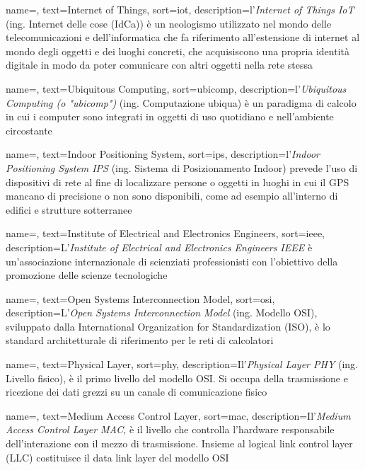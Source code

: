  {
    name=,
    text=Internet of Things,
    sort=iot,
    description={l'\emph{Internet of Things IoT} (ing. Internet delle cose (IdCa)) è un neologismo utilizzato nel mondo delle telecomunicazioni e dell'informatica che fa riferimento all'estensione di internet al mondo degli oggetti e dei luoghi concreti, che acquisiscono una propria identità digitale in modo da poter comunicare con altri oggetti nella rete stessa}
}

 {
    name=,
    text=Ubiquitous Computing,
    sort=ubicomp,
    description={l'\emph{Ubiquitous Computing (o "ubicomp")} (ing. Computazione ubiqua) è un paradigma di calcolo in cui i computer sono integrati in oggetti di uso quotidiano e nell'ambiente circostante}
}

 {
    name=,
    text=Indoor Positioning System,
    sort=ips,
    description={l'\emph{Indoor Positioning System IPS} (ing. Sistema di Posizionamento Indoor) prevede l'uso di dispositivi di rete al fine di localizzare persone o oggetti in luoghi in cui il GPS mancano di precisione o non sono disponibili, come ad esempio all'interno di edifici e strutture sotterranee}
}

 {
    name=,
    text=Institute of Electrical and Electronics Engineers,
    sort=ieee,
    description={L'\emph{Institute of Electrical and Electronics Engineers IEEE} è un'associazione internazionale di scienziati professionisti con l'obiettivo della promozione delle scienze tecnologiche}
}

 {
    name=,
    text=Open Systems Interconnection Model,
    sort=osi,
    description={L'\emph{Open Systems Interconnection Model} (ing. Modello OSI), sviluppato dalla International Organization for Standardization (ISO), è lo standard architetturale di riferimento per le reti di calcolatori}
}

 {
    name=,
    text=Physical Layer,
    sort=phy,
    description={Il'\emph{Physical Layer PHY} (ing. Livello fisico), è il primo livello del modello OSI. Si occupa della trasmissione e ricezione dei dati grezzi su un canale di comunicazione fisico}
}

 {
    name=,
    text=Medium Access Control Layer,
    sort=mac,
    description={Il'\emph{Medium Access Control Layer MAC}, è il livello che controlla l'hardware responsabile dell'interazione con il mezzo di trasmissione. Insieme al logical link control layer (LLC) costituisce il data link layer del modello OSI}
}

